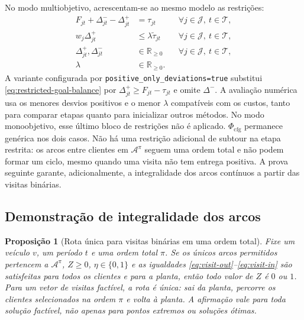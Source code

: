 \documentclass[11pt,a4paper]{article}
\newcommand{\Tset}{\mathcal{T}}
\newcommand{\A}{\mathcal{A}}
\newtheorem{proposition}{Proposição}
\begin{document}
\noindent No modo multiobjetivo, acrescentam-se ao mesmo modelo as restrições:
\begin{align}
 F_{jt}+\Delta^-_{jt}-\Delta^+_{jt}&=\tau_{jt}
 &&\forall j\in\mathcal J,\ t\in\Tset,
 \label{eq:restricted-goal-balance}\\
 w_j\Delta^+_{jt}&\le\lambda\widetilde\tau_{jt}
 &&\forall j\in\mathcal J,\ t\in\Tset,
 \label{eq:restricted-goal-bound}\\
 \Delta^+_{jt},\Delta^-_{jt}&\in\mathbb{R}_{\ge0}
 &&\forall j\in\mathcal J,\ t\in\Tset,
 \label{eq:restricted-goal-domain}\\
 \lambda&\in\mathbb{R}_{\ge0}.
 \label{eq:restricted-lambda-domain}
\end{align}
A variante configurada por \texttt{positive\_only\_deviations=true} substitui \eqref{eq:restricted-goal-balance} por $\Delta^+_{jt}\ge F_{jt}-\tau_{jt}$ e omite $\Delta^-$. A avaliação numérica usa os menores desvios positivos e o menor $\lambda$ compatíveis com os custos, tanto para comparar etapas quanto para inicializar outros métodos. No modo monoobjetivo, esse último bloco de restrições não é aplicado. $\Phi_{\mathrm{cfg}}$ permanece genérica nos dois casos. Não há uma restrição adicional de subtour na etapa restrita: os arcos entre clientes em $\A^\pi$ seguem uma ordem total e não podem formar um ciclo, mesmo quando uma visita não tem entrega positiva. A prova seguinte garante, adicionalmente, a integralidade dos arcos contínuos a partir das visitas binárias.

\subsection{Demonstração de integralidade dos arcos}

\begin{proposition}[Rota única para visitas binárias em uma ordem total]
Fixe um veículo $v$, um período $t$ e uma ordem total $\pi$. Se os únicos arcos permitidos pertencem a $\A^\pi$, $Z\ge0$, $\eta\in\{0,1\}$ e as igualdades \eqref{eq:visit-out}--\eqref{eq:visit-in} são satisfeitas para todos os clientes e para a planta, então todo valor de $Z$ é $0$ ou $1$. Para um vetor de visitas factível, a rota é única: sai da planta, percorre os clientes selecionados na ordem $\pi$ e volta à planta. A afirmação vale para toda solução factível, não apenas para pontos extremos ou soluções ótimas.
\label{prop:integral-arcs}
\end{proposition}
\end{document}
